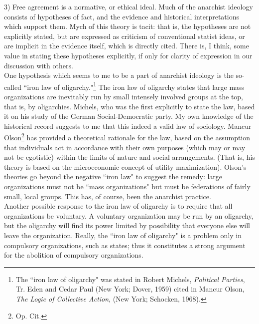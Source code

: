 3) Free agreement is a normative, or ethical ideal. Much of the anarchist ideology consists of hypotheses of fact, and the evidence and historical interpretations which support them. Mych of this theory is tacit: that is, the hypotheses are not explicitly stated, but are expressed as criticism of conventional statist ideas, or are implicit in the evidence itself, which is directly cited. There is, I think, some value in stating these hypotheses explicitly, if only for clarity of expression in our discussion with others.\\
One hypothesis which seems to me to be a part of anarchist ideology is the so-called ``iron law of oligarchy."\footnote{The ``iron law of oligarchy" was stated in Robert Michels, \emph{Political Parties}, Tr. Eden and Cedar Paul (New York; Dover, 1959) cited in Mancur Olson, \emph{The Logic of Collective Action}, (New York; Schocken, 1968).} The iron law of oligarchy states that large mass organizations are inevitably run by small intensely involved groups at the top, that is, by oligarchies. Michels, who was the first explicitly to state the law, based it on his study of the German Social-Democratic party. My own knowledge of the historical record suggests to me that this indeed a valid law of sociology. Mancur Olson\footnote{Op. Cit.} has provided a theoretical rationale for the law, based on the assumption that individuals act in accordance with their own purposes (which may or may not be egotistic) within the limits of nature and social arrangements. (That is, his theory is based on the microeconomic concept of utility maximization). Olson's theories go beyond the negative ``iron law" to suggest the remedy: large organizations must not be ``mass organizations" but must be federations of fairly small, local groups. This has, of course, been the anarchist practice.\\
Another possible response to the iron law of oligarchy is to require that all organizations be voluntary. A voluntary organization may be run by an oligarchy, but the oligarchy will find its power limited by possibility that everyone else will leave the organization. Really, the ``iron law of oligarchy" is a problem only in compulsory organizations, such as states; thus it constitutes a strong argument for the abolition of compulsory organizations.\\

